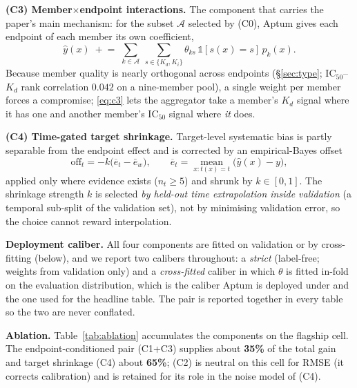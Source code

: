 \documentclass[10pt,letterpaper]{article}
\begin{document}
\smallskip
\noindent\textbf{(C3) Member$\times$endpoint interactions.} The component that
carries the paper's main mechanism: for the subset $\mathcal A$ selected by (C0),
Aptum gives each endpoint of each member its own coefficient,
\begin{equation}
\hat y(x)\;\mathrel{+}=\;\sum_{k\in\mathcal A}\ \sum_{s\in\{K_d,K_i\}}
\theta_{ks}\,\mathbb 1[s(x){=}s]\,p_k(x).
\label{eq:c3}
\end{equation}
Because member quality is nearly orthogonal across endpoints ({\S}\ref{sec:type};
IC$_{50}$--$K_d$ rank correlation $0.042$ on a nine-member pool), a single weight per
member forces a compromise; \eqref{eq:c3} lets the aggregator take a member's $K_d$
signal where it has one and another member's IC$_{50}$ signal where \emph{it} does.

\smallskip
\noindent\textbf{(C4) Time-gated target shrinkage.} Target-level systematic bias is
partly separable \citep{efron1975} from the endpoint effect and is corrected by an empirical-Bayes
offset
\begin{equation}
\mathrm{off}_t=-k\big(\overline{e}_t-\bar e_w\big),
\qquad \overline{e}_t=\operatorname*{mean}_{x:t(x)=t}\big(\hat y(x)-y\big),
\label{eq:c4}
\end{equation}
applied only where evidence exists ($n_t\ge 5$) and shrunk by $k\in[0,1]$. The
shrinkage strength $k$ is selected \emph{by held-out time extrapolation inside
validation} (a temporal sub-split of the validation set), not by minimising validation
error, so the choice cannot reward interpolation.

\smallskip
\noindent\textbf{Deployment caliber.} All four components are fitted on validation or
by cross-fitting (below), and we report two calibers throughout: a \emph{strict}
(label-free; weights from validation only) and a \emph{cross-fitted} caliber in which
$\theta$ is fitted in-fold on the evaluation distribution, which is the caliber
Aptum is deployed under and the one used for the headline table. The pair is
reported together in every table so the two are never conflated.

\smallskip
\noindent\textbf{Ablation.} Table~\ref{tab:ablation} accumulates the components on
the flagship cell. The endpoint-conditioned pair (C1+C3) supplies about
\textbf{35\%} of the total gain and target shrinkage (C4) about \textbf{65\%};
(C2) is neutral on this cell for RMSE (it corrects calibration) and is retained for
its role in the noise model of (C4).
\end{document}
